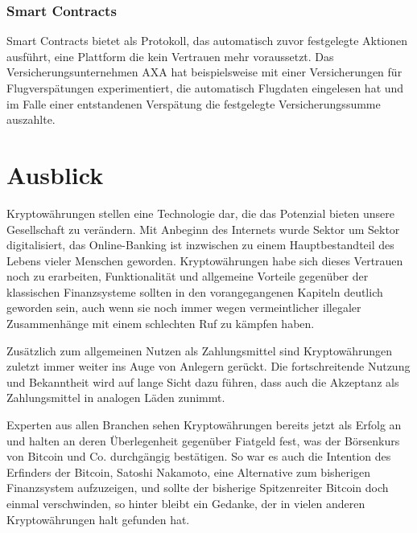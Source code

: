 \documentclass[12pt,oneside]{article}
\begin{document}
\subsubsection{Smart Contracts}

Smart Contracts bietet als Protokoll, das automatisch zuvor festgelegte Aktionen ausführt, eine Plattform die kein Vertrauen mehr voraussetzt. Das Versicherungsunternehmen AXA hat beispielsweise mit einer Versicherungen für Flugverspätungen experimentiert, die automatisch Flugdaten eingelesen hat und im Falle einer entstandenen Verspätung die festgelegte Versicherungssumme auszahlte. \citep{hmd2019}

\section{Ausblick}

Kryptowährungen stellen eine Technologie dar, die das Potenzial bieten unsere Gesellschaft zu verändern. Mit Anbeginn des Internets wurde Sektor um Sektor digitalisiert, das Online-Banking ist inzwischen zu einem Hauptbestandteil des Lebens vieler Menschen geworden. Kryptowährungen habe sich dieses Vertrauen noch zu erarbeiten, Funktionalität und allgemeine Vorteile gegenüber der klassischen Finanzsysteme sollten in den vorangegangenen Kapiteln deutlich geworden sein, auch wenn sie noch immer wegen vermeintlicher illegaler Zusammenhänge mit einem schlechten Ruf zu kämpfen haben.

Zusätzlich zum allgemeinen Nutzen als Zahlungsmittel sind Kryptowährungen zuletzt immer weiter ins Auge von Anlegern gerückt. Die fortschreitende Nutzung und Bekanntheit wird auf lange Sicht dazu führen, dass auch die Akzeptanz als Zahlungsmittel in analogen Läden zunimmt.

Experten aus allen Branchen sehen Kryptowährungen bereits jetzt als Erfolg an und halten an deren Überlegenheit gegenüber Fiatgeld fest, was der Börsenkurs von Bitcoin und Co. durchgängig bestätigen. So war es auch die Intention des Erfinders der Bitcoin, Satoshi Nakamoto, eine Alternative zum bisherigen Finanzsystem aufzuzeigen, und sollte der bisherige Spitzenreiter Bitcoin doch einmal verschwinden, so hinter bleibt ein Gedanke, der in vielen anderen Kryptowährungen halt gefunden hat.
\clearpage
\lhead{}
\printbibliography
{}



\end{document}
